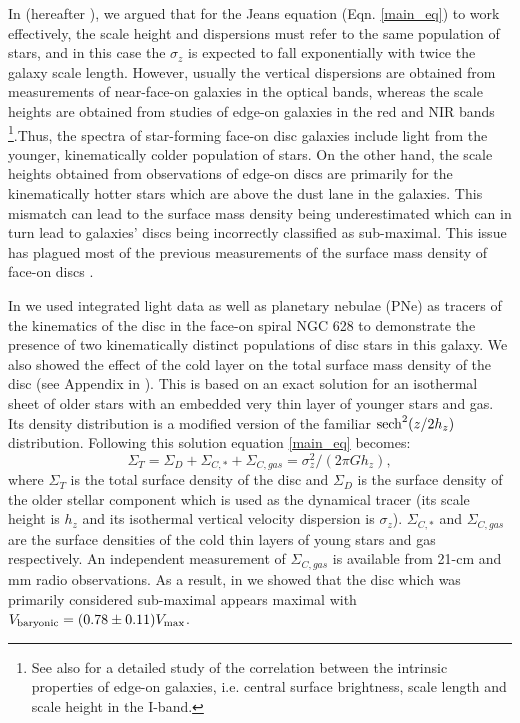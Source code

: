 \documentclass[fleqn,usenatbib]{mnras}
\begin{document}
In \citealt{Aniyan:18} (hereafter ), we argued that for the Jeans equation (Eqn. \ref{main_eq}) to work effectively, the scale height and dispersions must refer to the same population of stars, and in this case the $\sigma_z$ is expected to fall exponentially with twice the galaxy scale length. However, usually the vertical dispersions are obtained from measurements of near-face-on galaxies in the optical bands, whereas the scale heights are obtained from studies of edge-on galaxies in the red and NIR bands \citep{Kregel:02}\footnote{ See also \citet{Kregel:05} for a detailed study of the correlation between the intrinsic properties of edge-on galaxies, i.e. central surface brightness, scale length and scale height in the I-band.}.Thus, the spectra of star-forming face-on disc galaxies include light from the younger, kinematically colder population of stars. On the other hand, the scale heights obtained from observations of edge-on discs are primarily for the kinematically hotter stars which are above the dust lane in the galaxies. This mismatch can lead to the surface mass density being underestimated which can in turn lead to galaxies' discs being incorrectly classified as sub-maximal. This issue has plagued most of the previous measurements of the surface mass density of face-on discs \citep{HC3, DMS5}.

In  we used integrated light data as well as planetary nebulae (PNe) as tracers of the kinematics of the disc in the face-on spiral NGC 628 to demonstrate the presence of two kinematically distinct populations of disc stars in this galaxy. We also showed the effect of the cold layer on the total surface mass density of the disc (see Appendix in ). This is based on an exact solution for an isothermal sheet of older stars with an embedded very thin layer of younger stars and gas. Its density distribution is a modified version of the familiar ${\rm sech}^{2}(z/2h_z)$ distribution. Following this solution equation \ref{main_eq} becomes:
\begin{equation}
\Sigma_T = \Sigma_D + \Sigma_{C,*} + \Sigma_{C,gas} = \sigma_z^2/(2 \pi G h_z),
\label{main_eq2}
\end{equation}
where $\Sigma_T$ is the total surface density of the disc and $\Sigma_D$ is the surface density of the older stellar component which is used as the dynamical tracer (its scale height is $h_z$ and its isothermal vertical velocity dispersion is $\sigma_z$).  $\Sigma_{C,*}$ and $\Sigma_{C,gas}$ are the surface densities of the cold thin layers of young stars and gas respectively. An independent measurement of $\Sigma_{C,gas}$ is available from 21-cm and mm radio observations. As a result, in  we showed that the disc which was primarily considered sub-maximal \citep{HC3} appears maximal with $V_{\rm baryonic} = (0.78 \pm 0.11)V_{\rm max}$.
\end{document}
